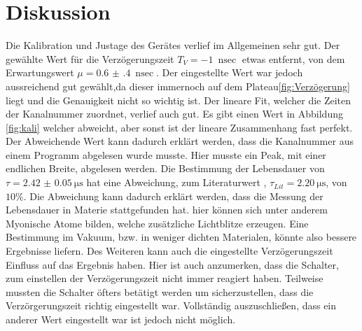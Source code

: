 \section{Diskussion}
Die Kalibration und Justage des Gerätes verlief im Allgemeinen sehr gut. Der gewählte Wert für die Verzögerungszeit $T_{V} = \SI{-1}{\nano\sec}$ etwas entfernt, von dem Erwartungswert $\mu = \SI{0.6(4)}{\nano\sec}$. Der eingestellte Wert war jedoch aussreichend gut gewählt,da dieser immernoch auf dem Plateau\ref{fig:Verzögerung} liegt und die Genauigkeit nicht so wichtig ist.
Der lineare Fit, welcher die Zeiten der Kanalnummer zuordnet, verlief auch gut. Es gibt einen Wert in Abbildung \ref{fig:kali} welcher abweicht, aber sonst ist der lineare Zusammenhang fast perfekt. Der Abweichende Wert kann dadurch erklärt werden, dass die Kanalnummer aus einem Programm abgelesen wurde musste. Hier musste ein Peak, mit einer endlichen Breite, abgelesen werden. 
Die Bestimmung der Lebensdauer von $\tau = \SI{2.42(5)}{\micro\second}$ hat eine Abweichung, zum Literaturwert \cite{PDG}, $\tau_{Lit} = \SI{2.20}{\micro\second}$, von $10 \%$. Die Abweichung kann dadurch erklärt werden, dass die Messung der Lebensdauer in Materie stattgefunden hat. hier können sich unter anderem Myonische Atome bilden, welche zusätzliche Lichtblitze erzeugen.
Eine Bestimmung im Vakuum, bzw. in weniger dichten Materialen, könnte also bessere Ergebnisse liefern. Des Weiteren kann auch die eingestellte Verzögerungszeit Einfluss auf das Ergebnis haben. Hier ist auch anzumerken, dass die Schalter, zum einstellen der Verzögerungszeit nicht immer reagiert haben. Teilweise mussten die Schalter öfters betätigt werden um sicherzustellen, dass die Verzörgerungszeit richtig eingestellt war. Vollständig auszuschließen, dass ein anderer Wert eingestellt war ist jedoch nicht möglich.